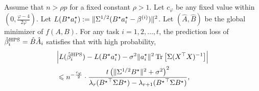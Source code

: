 \begin{theorem}\label{thm_many_tasks}
	Assume that $n > \rho p$ for a fixed constant $\rho > 1$.
	Let $c_{\varphi}$ be any fixed value within $(0, \frac{\varphi-4}{2\varphi})$.
	Let $L(B^{\star}a_i^{\star}): = \|\Sigma^{1/2} (B^{\star} a_i^{\star}- \beta^{(i)})\|^2$.
	Let $(\hat{A}, \hat{B})$ be the global minimizer of $f(A, B)$.
	For any task $i = 1, 2, \dots, t$, the prediction loss of $\hat{\beta}_i^{\textup{HPS}} = \hat{B} \hat{A}_i$ satisfies that with high probability,
	\begin{align*}
		&{\left| {L(\hat{\beta}_i^{\textup{HPS}}) - L(B^{\star}a_i^{\star}) - \sigma^2 \|a_i^{\star}\|^2 \operatorname{Tr}\left[\Sigma (X^{\top}X)^{-1}\right]} \right|} \\
		&\leqslant n^{-\frac{c_{\varphi}}2} \cdot \frac{t \left({ \|\Sigma^{1/2} B^{\star}\|^2+  \sigma^2}\right)^2} {\lambda_r ({B^\star}^\top \Sigma B^\star)- \lambda_{r+1}({B^\star}^\top \Sigma B^\star)},
	\end{align*}
\end{theorem}

